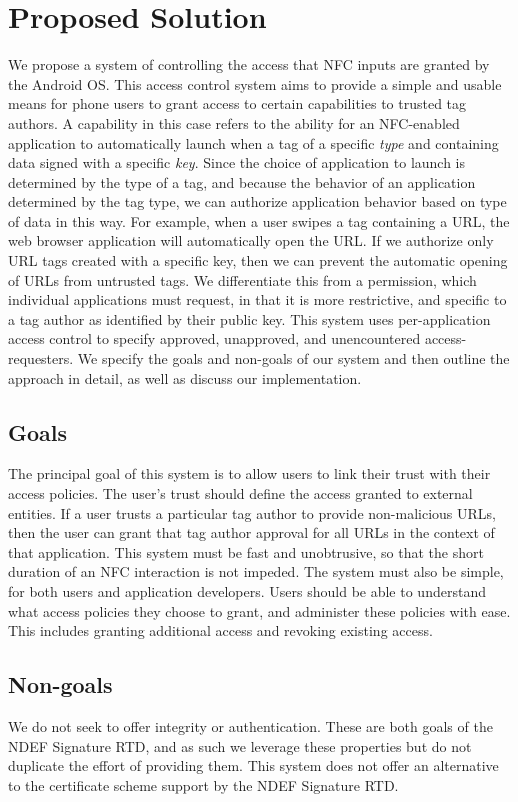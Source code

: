 \documentclass[12pt]{article}
\begin{document}
\section{Proposed Solution}
We propose a system of controlling the access that NFC inputs are granted by the Android OS.
This access control system aims to provide a simple and usable means for phone users to grant access to certain capabilities to trusted tag authors.
A capability in this case refers to the ability for an NFC-enabled application to automatically launch when a tag of a specific \textit{type} and containing data signed with a specific \textit{key}.
Since the choice of application to launch is determined by the type of a tag, and because the behavior of an application determined by the tag type, we can authorize application behavior based on type of data in this way.
For example, when a user swipes a tag containing a URL, the web browser application will automatically open the URL.
If we authorize only URL tags created with a specific key, then we can prevent the automatic opening of URLs from untrusted tags.
We differentiate this from a permission, which individual applications must request, in that it is more restrictive, and specific to a tag author as identified by their public key.
This system uses per-application access control to specify approved, unapproved, and unencountered access-requesters.
We specify the goals and non-goals of our system and then outline the approach in detail, as well as discuss our implementation.

\subsection{Goals}
The principal goal of this system is to allow users to link their trust with their access policies.
The user's trust should define the access granted to external entities.
If a user trusts a particular tag author to provide non-malicious URLs, then the user can grant that tag author approval for all URLs in the context of that application.
This system must be fast and unobtrusive, so that the short duration of an NFC interaction is not impeded.
The system must also be simple, for both users and application developers.
Users should be able to understand what access policies they choose to grant, and administer these policies with ease.
This includes granting additional access and revoking existing access.

\subsection{Non-goals}
We do not seek to offer integrity or authentication.
These are both goals of the NDEF Signature RTD, and as such we leverage these properties but do not duplicate the effort of providing them.
This system does not offer an alternative to the certificate scheme support by the NDEF Signature RTD.
\end{document}
